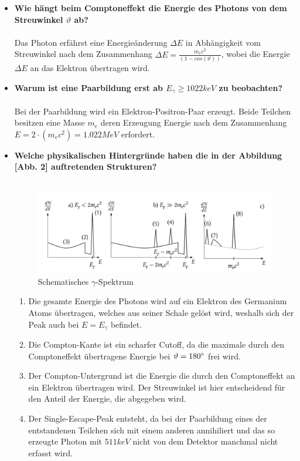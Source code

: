 \documentclass{article}
\begin{document}
\begin{itemize}
	\item \textbf{Wie hängt beim Comptoneffekt die Energie des Photons von dem Streuwinkel \boldmath$\vartheta$ ab?}\\\\
	Das Photon erfährst eine Energieänderung $\Delta E$ in Abhängigkeit vom Streuwinkel nach dem Zusammenhang $\Delta E=\frac{m_ec^2}{(1-cos(\vartheta))}$, wobei die Energie $\Delta E$ an das Elektron übertragen wird.
	\item \textbf{Warum ist eine Paarbildung erst ab \boldmath$E_\gamma\geq1022keV$ zu beobachten?}\\\\
	Bei der Paarbildung wird ein Elektron-Positron-Paar erzeugt. Beide Teilchen besitzen eine Masse $m_e$ deren Erzeugung Energie nach dem Zusammenhang $E=2\cdot(m_ec^2)=1.022MeV$ erfordert.  
	\item \textbf{Welche physikalischen Hintergründe haben die in der Abbildung [Abb. 2] auftretenden Strukturen?}\\\\
	\begin{figure}[h!]
	\centering
	\includegraphics[scale=0.4]{Abb1.jpg}
	\caption{Schematisches $\gamma$-Spektrum}
	\end{figure}
	\begin{enumerate}
		\item Die gesamte Energie des Photons wird auf ein Elektron des Germanium Atoms übertragen, welches aus seiner Schale gelöst wird, weshalb sich der Peak auch bei $E=E_\gamma$ befindet.
		\item Die Compton-Kante ist ein scharfer Cutoff, da die maximale durch den Comptoneffekt übertragene Energie bei $\vartheta=180\degree$ frei wird.
		\item Der Compton-Untergrund ist die Energie die durch den Comptoneffekt an ein Elektron übertragen wird. Der Streuwinkel ist hier entscheidend für den Anteil der Energie, die abgegeben wird.
		\item Der Single-Escape-Peak entsteht, da bei der Paarbildung eines der entstandenen Teilchen sich mit einem anderen annihiliert und das so erzeugte Photon mit $511keV$ nicht von dem Detektor manchmal nicht erfasst wird.

\end{enumerate}
\end{itemize}
\end{document}
